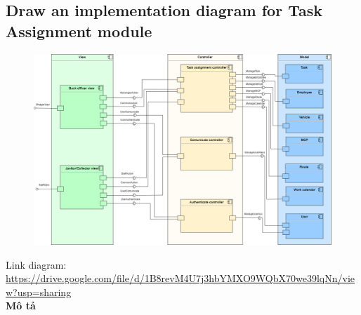\documentclass[a4paper]{article}
\begin{document}
\subsection{Draw an implementation diagram for Task Assignment module}
\begin{figure}[!h]
    \begin{center}
      \includegraphics[width=6in]{Image/MVC-mk.png}
    \end{center}
\end{figure}
Link diagram: \url{https://drive.google.com/file/d/1B8revM4U7j3hbYMXO9WQbX70we39lqNn/view?usp=sharing}
\\
 \textbf{Mô tả}
\end{document}
